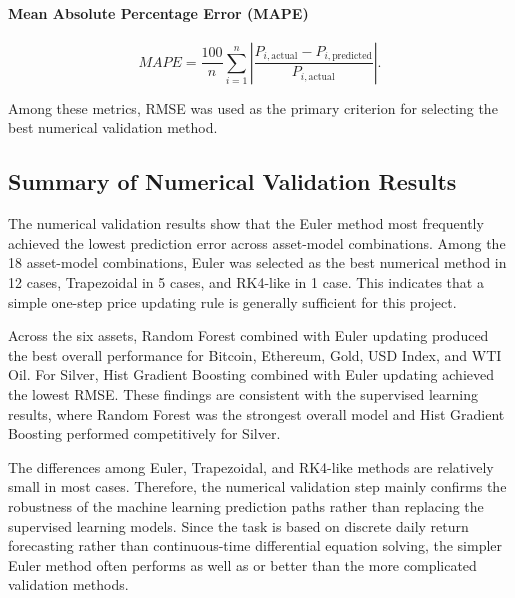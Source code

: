 \documentclass[12pt]{article}
\begin{document}
\paragraph{Mean Absolute Percentage Error (MAPE)}
\[
MAPE = \frac{100}{n}\sum_{i=1}^{n}\left|\frac{P_{i,\text{actual}} - P_{i,\text{predicted}}}{P_{i,\text{actual}}}\right|.
\]

Among these metrics, RMSE was used as the primary criterion for selecting the best numerical validation method.

\subsection{Summary of Numerical Validation Results}

The numerical validation results show that the Euler method most frequently achieved the lowest prediction error across asset-model combinations. Among the 18 asset-model combinations, Euler was selected as the best numerical method in 12 cases, Trapezoidal in 5 cases, and RK4-like in 1 case. This indicates that a simple one-step price updating rule is generally sufficient for this project.

Across the six assets, Random Forest combined with Euler updating produced the best overall performance for Bitcoin, Ethereum, Gold, USD Index, and WTI Oil. For Silver, Hist Gradient Boosting combined with Euler updating achieved the lowest RMSE. These findings are consistent with the supervised learning results, where Random Forest was the strongest overall model and Hist Gradient Boosting performed competitively for Silver.

The differences among Euler, Trapezoidal, and RK4-like methods are relatively small in most cases. Therefore, the numerical validation step mainly confirms the robustness of the machine learning prediction paths rather than replacing the supervised learning models. Since the task is based on discrete daily return forecasting rather than continuous-time differential equation solving, the simpler Euler method often performs as well as or better than the more complicated validation methods.
\end{document}
